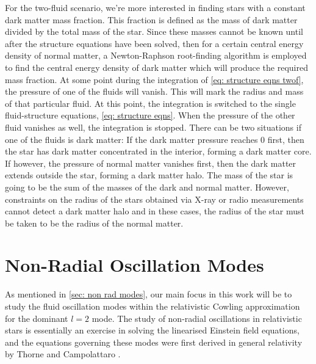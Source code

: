 \documentclass[a4paper,12pt,onehalfspacing]{report}
\begin{document}
For the two-fluid scenario, we're more interested in finding stars with a constant dark matter mass fraction. This fraction is defined as the mass of dark matter divided by the total mass of the star. Since these masses cannot be known until after the structure equations have been solved, then for a certain central energy density of normal matter, a Newton-Raphson root-finding algorithm is employed to find the central energy density of dark matter which will produce the required mass fraction. At some point during the integration of \cref{eq: structure eqns twof}, the pressure of one of the fluids will vanish. This will mark the radius and mass of that particular fluid. At this point, the integration is switched to the single fluid-structure equations, \cref{eq: structure eqns}. When the pressure of the other fluid vanishes as well, the integration is stopped. There can be two situations if one of the fluids is dark matter: If the dark matter pressure reaches $0$ first, then the star has dark matter concentrated in the interior, forming a dark matter core. If however, the pressure of normal matter vanishes first, then the dark matter extends outside the star, forming a dark matter halo. The mass of the star is going to be the sum of the masses of the dark and normal matter. However, constraints on the radius of the stars obtained via X-ray or radio measurements cannot detect a dark matter halo and in these cases, the radius of the star must be taken to be the radius of the normal matter.

\chapter{Non-Radial Oscillation Modes}

As mentioned in \cref{sec: non rad modes}, our main focus in this work will be to study the fluid oscillation modes within the relativistic Cowling approximation for the dominant $l=2$ mode. The study of non-radial oscillations in relativistic stars is essentially an exercise in solving the linearised Einstein field equations, and the equations governing these modes were first derived in general relativity by Thorne and Campolattaro \cite{Thorne_Campo}.
\end{document}
